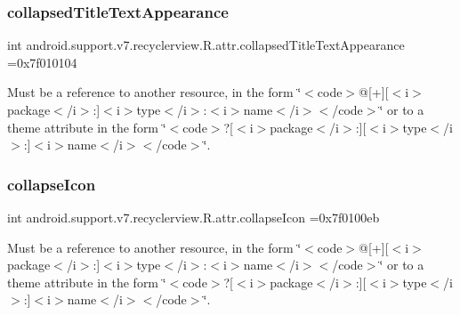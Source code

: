 \subsubsection{\texorpdfstring{collapsed\+Title\+Text\+Appearance}{collapsedTitleTextAppearance}}
{\footnotesize\ttfamily int android.\+support.\+v7.\+recyclerview.\+R.\+attr.\+collapsed\+Title\+Text\+Appearance =0x7f010104\hspace{0.3cm}{\ttfamily [static]}}

Must be a reference to another resource, in the form \char`\"{}$<$code$>$@\mbox{[}+\mbox{]}\mbox{[}$<$i$>$package$<$/i$>$\+:\mbox{]}$<$i$>$type$<$/i$>$\+:$<$i$>$name$<$/i$>$$<$/code$>$\char`\"{} or to a theme attribute in the form \char`\"{}$<$code$>$?\mbox{[}$<$i$>$package$<$/i$>$\+:\mbox{]}\mbox{[}$<$i$>$type$<$/i$>$\+:\mbox{]}$<$i$>$name$<$/i$>$$<$/code$>$\char`\"{}. \mbox{\label{classandroid_1_1support_1_1v7_1_1recyclerview_1_1R_1_1attr_ac5447ae537ecc4297c8e7ff5ff6f2efe}} 
\subsubsection{\texorpdfstring{collapse\+Icon}{collapseIcon}}
{\footnotesize\ttfamily int android.\+support.\+v7.\+recyclerview.\+R.\+attr.\+collapse\+Icon =0x7f0100eb\hspace{0.3cm}{\ttfamily [static]}}

Must be a reference to another resource, in the form \char`\"{}$<$code$>$@\mbox{[}+\mbox{]}\mbox{[}$<$i$>$package$<$/i$>$\+:\mbox{]}$<$i$>$type$<$/i$>$\+:$<$i$>$name$<$/i$>$$<$/code$>$\char`\"{} or to a theme attribute in the form \char`\"{}$<$code$>$?\mbox{[}$<$i$>$package$<$/i$>$\+:\mbox{]}\mbox{[}$<$i$>$type$<$/i$>$\+:\mbox{]}$<$i$>$name$<$/i$>$$<$/code$>$\char`\"{}. \mbox{\label{classandroid_1_1support_1_1v7_1_1recyclerview_1_1R_1_1attr_ad0373f8f0633a36313f67e07e056422d}} 
